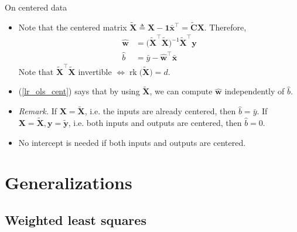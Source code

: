 \documentclass{beamer}
\numberwithin{equation}{section}
\newcommand{\aref}[1]{\alert{\ref{#1}}}
\begin{document}
\begin{frame}{On centered data}
    \begin{itemize}
        \item
        Note that the centered matrix $ \tilde{\mathbf{X}} \triangleq
        \mathbf{X} - \mathbf{1}\bar{\mathbf{x}}^\top =
        \tilde{\mathbf{C}}\mathbf{X} $. Therefore,
        \begin{equation} \label{lr_ols_cent}
            \begin{split}
                \hat{\mathbf{w}} & = \big(
	                \tilde{\mathbf{X}}^\top\tilde{\mathbf{X}}
	            \big)^{-1}\tilde{\mathbf{X}}^\top\mathbf{y} \\
	            \hat{b} & = \bar{y} - \hat{\mathbf{w}}^\top\bar{\mathbf{x}}
            \end{split}
        \end{equation}
        Note that $ \tilde{\mathbf{X}}^\top\tilde{\mathbf{X}} $ invertible
        $ \Leftrightarrow \operatorname{rk}\big(\tilde{\mathbf{X}}\big) = d $.

        \item
        (\aref{lr_ols_cent}) says that by using $ \tilde{\mathbf{X}} $, we can
        compute $ \hat{\mathbf{w}} $ independently of $ \hat{b} $.

        \item
        \textit{Remark.} If $ \mathbf{X} = \tilde{\mathbf{X}} $, i.e. the
        inputs are already centered, then $ \hat{b} = \bar{y} $. If
        $ \mathbf{X} = \tilde{\mathbf{X}}, \mathbf{y} = \tilde{\mathbf{y}} $,
        i.e. both inputs and outputs are centered, then $ \hat{b} = 0 $.

        \item
        \alert{No intercept is needed if both inputs and outputs are centered.}
    \end{itemize}
\end{frame}

\section{Generalizations}

\subsection{Weighted least squares}
\end{document}
